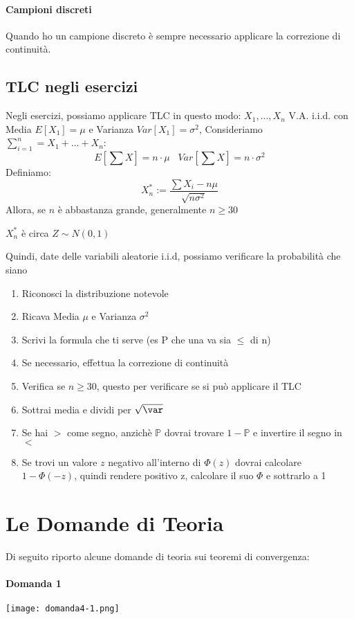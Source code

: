 \paragraph{Campioni discreti} Quando ho un campione discreto è sempre necessario
applicare la correzione di continuità.

\subsection{TLC negli esercizi}
Negli esercizi, possiamo applicare TLC in questo modo:
$X_1, ..., X_n$ V.A. i.i.d. con Media $E[X_1] = \mu$ e Varianza $ Var[X_1] = \sigma^2$, 
Consideriamo $\sum_{i = 1}^{n} = X_1 + ... + X_n$:
\[  E[\sum X] = n \cdot \mu \;\;\; Var[\sum X] = n\cdot \sigma^2 \]
Definiamo:
\[ X_n^* := \frac{\sum X_i - n\mu}{\sqrt{n\sigma^2}}\]
Allora, se $n$ è abbastanza grande, generalmente $n\geq 30$
\begin{center}
    $X_n^*$ è circa $Z\sim N(0,1)$
\end{center}

Quindi, date delle variabili aleatorie i.i.d, possiamo verificare la probabilità che siano  
\begin{enumerate}
    \item Riconosci la distribuzione notevole
    \item Ricava Media $\mu$ e Varianza $\sigma^2$
    \item Scrivi la formula che ti serve (es P che una va sia $\leq$ di n)
    \item Se necessario, effettua la correzione di continuità
    \item Verifica se $n\geq 30$, questo per verificare se si può applicare il TLC
    \item Sottrai media e dividi per $\sqrt{\var}$
    \item Se hai $>$ come segno, anzichè $\mathbb{P}$ dovrai trovare $1-\mathbb{P}$ e invertire il segno in $<$
    \item Se trovi un valore $z$ negativo all'interno di $\Phi(z)$ dovrai calcolare $1 - \Phi(-z)$, quindi rendere positivo
    z, calcolare il suo $\Phi$ e sottrarlo a 1
\end{enumerate}

\pagebreak
\section{Le Domande di Teoria}
Di seguito riporto alcune domande di teoria sui teoremi di convergenza:
\paragraph{Domanda 1}
\begin{center}
    \texttt{[image: domanda4-1.png]}
\end{center}
